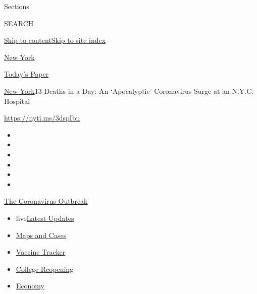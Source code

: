 Sections

SEARCH

\protect\hyperlink{site-content}{Skip to
content}\protect\hyperlink{site-index}{Skip to site index}

\href{https://www.nytimes.com/section/nyregion}{New York}

\href{https://myaccount.nytimes.com/auth/login?response_type=cookie\&client_id=vi}{}

\href{https://www.nytimes.com/section/todayspaper}{Today's Paper}

\href{/section/nyregion}{New York}\textbar{}13 Deaths in a Day: An
`Apocalyptic' Coronavirus Surge at an N.Y.C. Hospital

\url{https://nyti.ms/3dspIbn}

\begin{itemize}
\item
\item
\item
\item
\item
\item
\end{itemize}

\href{https://www.nytimes.com/news-event/coronavirus?action=click\&pgtype=Article\&state=default\&region=TOP_BANNER\&context=storylines_menu}{The
Coronavirus Outbreak}

\begin{itemize}
\tightlist
\item
  live\href{https://www.nytimes.com/2020/08/04/world/coronavirus-cases.html?action=click\&pgtype=Article\&state=default\&region=TOP_BANNER\&context=storylines_menu}{Latest
  Updates}
\item
  \href{https://www.nytimes.com/interactive/2020/us/coronavirus-us-cases.html?action=click\&pgtype=Article\&state=default\&region=TOP_BANNER\&context=storylines_menu}{Maps
  and Cases}
\item
  \href{https://www.nytimes.com/interactive/2020/science/coronavirus-vaccine-tracker.html?action=click\&pgtype=Article\&state=default\&region=TOP_BANNER\&context=storylines_menu}{Vaccine
  Tracker}
\item
  \href{https://www.nytimes.com/2020/08/02/us/covid-college-reopening.html?action=click\&pgtype=Article\&state=default\&region=TOP_BANNER\&context=storylines_menu}{College
  Reopening}
\item
  \href{https://www.nytimes.com/live/2020/08/04/business/stock-market-today-coronavirus?action=click\&pgtype=Article\&state=default\&region=TOP_BANNER\&context=storylines_menu}{Economy}
\end{itemize}

